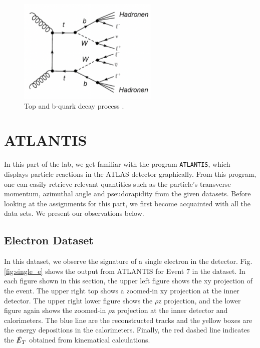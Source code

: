 \documentclass[a4paper]{report}
\numberwithin{equation}{section}
\begin{document}
\begin{figure}[htpb]
    \centering
    \includegraphics[width=0.6\textwidth]{bdecay}
    \caption{Top and b-quark decay process \cite{labman}.}
    \label{fig:bdecay}
\end{figure}

\chapter{ATLANTIS} \label{chap:atlantis}

In this part of the lab, we get familiar with the program \texttt{ATLANTIS}, which displays particle reactions in the ATLAS detector graphically. 
From this program, one can easily retrieve relevant quantities such as the particle's transverse momentum, azimuthal angle and pseudorapidity
from the given datasets. 
Before looking at the assignments for this part, we first become acquainted with all the data sets. We present our observations below. 

\section{Electron Dataset}

In this dataset, we observe the signature of a single electron in the detector. Fig. \ref{fig:single_e} shows the output from ATLANTIS for Event 7 in the 
dataset. In each figure shown in this section, the upper left figure shows the xy projection of the 
event. The upper right top shows a zoomed-in xy projection at the inner detector. The upper right lower figure shows the $\rho$z 
projection, and the lower figure again shows the zoomed-in $\rho$z projection at the inner detector and calorimeters. The blue line
 are the reconstructed tracks and the yellow boxes are the energy depositions in the calorimeters. Finally, the red dashed line 
 indicates the $\slashed{E}_T$ obtained from kinematical calculations.
\end{document}
